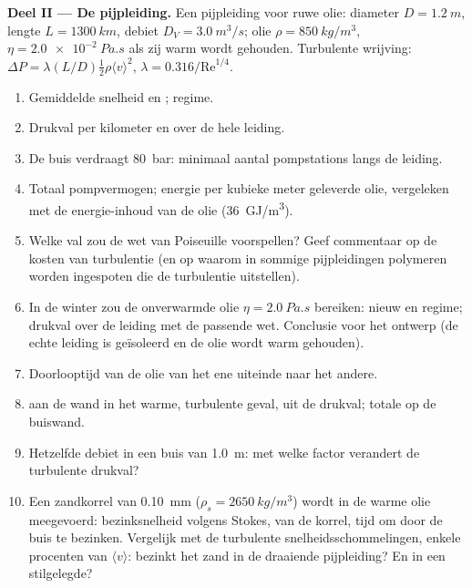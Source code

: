 \begin{problem}
\medskip
\noindent\textbf{Deel II --- De pijpleiding.}
Een pijpleiding voor ruwe olie: diameter $D = \qty{1.2}{m}$, lengte
$L = \qty{1300}{km}$, debiet $D_V = \qty{3.0}{m^3/s}$; olie
$\rho = \qty{850}{kg/m^3}$, $\eta =
\qty{2.0e-2}{Pa.s}$ als zij warm wordt
gehouden. Turbulente wrijving:
$\Delta P = \lambda
(L/D)\tfrac12\rho\langle v\rangle^2$,
$\lambda = 0.316/\mathrm{Re}^{1/4}$.
\begin{enumerate}[resume]
  \item Gemiddelde snelheid en ; regime.
  \item Drukval per kilometer en over de hele leiding.
  \item De buis verdraagt \qty{80}{bar}: minimaal aantal pompstations langs
        de leiding.
  \item Totaal pompvermogen; energie per kubieke meter geleverde olie,
        vergeleken met de energie-inhoud van de olie (\qty{36}{GJ/m^3}).
  \item Welke val zou de wet van Poiseuille voorspellen? Geef commentaar op
        de kosten van turbulentie (en op waarom in sommige pijpleidingen
        polymeren worden ingespoten die de turbulentie uitstellen).
  \item In de winter zou de onverwarmde olie $\eta = \qty{2.0}{Pa.s}$
        bereiken: nieuw  en regime; drukval over de leiding met
        de passende wet. Conclusie voor het ontwerp (de echte leiding is
        geïsoleerd en de olie wordt warm gehouden).
  \item Doorlooptijd van de olie van het ene uiteinde naar het andere.
  \item {} aan de wand in het warme, turbulente geval, uit de
        drukval; totale  op de buiswand.
  \item Hetzelfde debiet in een buis van \qty{1.0}{m}: met welke factor
        verandert de turbulente drukval?
  \item Een zandkorrel van \qty{0.10}{mm} ($\rho_s = \qty{2650}{kg/m^3}$)
        wordt in de warme olie meegevoerd: bezinksnelheid volgens Stokes,
         van de korrel, tijd om door de buis te bezinken.
        Vergelijk met de turbulente snelheidsschommelingen, enkele procenten
        van $\langle v
        \rangle$: bezinkt het zand in de draaiende
        pijpleiding? En in een stilgelegde?
\end{enumerate}


\end{problem}

